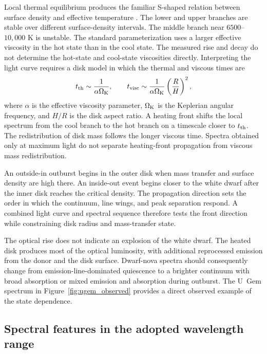 \documentclass[10pt,onecolumn]{article}
\begin{document}
Local thermal equilibrium produces the familiar S-shaped relation between
surface density and effective temperature \cite{lasota2001}. The lower and
upper branches are stable over different surface-density intervals. The
middle branch near $6500$--$10{,}000$ K is unstable. The standard
parameterization uses a larger effective viscosity in the hot state than in
the cool state. The measured rise and decay do not determine the hot-state and
cool-state viscosities directly. Interpreting the light curve requires a disk
model in which the thermal and viscous times are
\begin{equation}
 t_{\rm th}\sim \frac{1}{\alpha\Omega_{\rm K}},
 \qquad
 t_{\rm visc}\sim \frac{1}{\alpha\Omega_{\rm K}}
 \left(\frac{R}{H}\right)^2 ,
 \label{eq:disk_times}
\end{equation}
where $\alpha$ is the effective viscosity parameter, $\Omega_{\rm K}$ is the
Keplerian angular frequency, and $H/R$ is the disk aspect ratio. A heating
front shifts the local spectrum from the cool branch to the hot branch on a
timescale closer to $t_{\rm th}$. The
redistribution of disk mass follows the longer viscous time. Spectra obtained
only at maximum light do not separate heating-front propagation from viscous
mass redistribution.

An outside-in outburst begins in the outer disk when mass transfer and surface
density are high there. An inside-out event begins closer to the white dwarf
after the inner disk reaches the critical density. The propagation direction
sets the order in which the continuum, line wings, and peak separation
respond. A combined light curve and spectral sequence therefore tests the
front direction while constraining disk radius and mass-transfer state.

The optical rise does not indicate an explosion of the white dwarf. The heated
disk produces most of the optical luminosity, with additional reprocessed
emission from the donor and the disk surface. Dwarf-nova spectra should
consequently change from emission-line-dominated quiescence to a brighter
continuum with broad absorption or mixed emission and absorption during
outburst.
The U~Gem spectrum in Figure~\ref{fig:ugem_observed} provides a direct
observed example of the state dependence.

\subsection{Spectral features in the adopted wavelength range}
\end{document}
